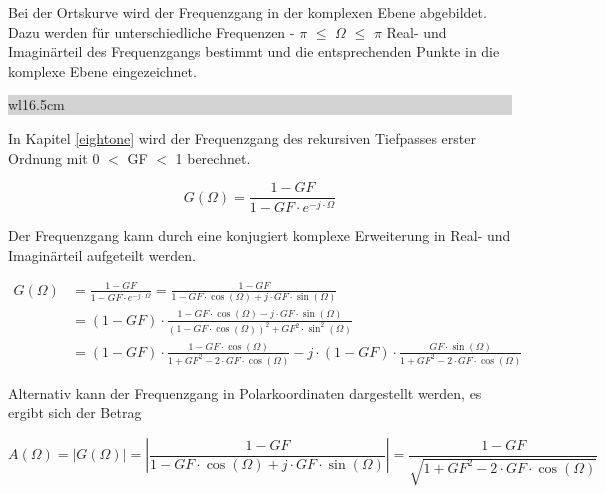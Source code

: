 \noindent Bei der Ortskurve wird der Frequenzgang in der komplexen Ebene abgebildet. Dazu werden f\"{u}r unterschiedliche Frequenzen - $\pi$ $\mathrm{\le}$ $\Omega$ $\mathrm{\le}$ $\pi$ Real- und Imagin\"{a}rteil des Frequenzgangs bestimmt und die entsprechenden Punkte in die komplexe Ebene eingezeichnet. \bigskip

\noindent
\colorbox{lightgray}{%
%
\renewcommand\arraystretch{0.6}%
\begin{tabular}{ wl{16.5cm} }
{\selectfont{Beispiel: Rekursives Tiefpass-Filter}}
\end{tabular}%
}\medskip

\noindent In Kapitel \ref{eightone} wird der Frequenzgang des rekursiven Tiefpasses erster Ordnung mit 0 $\mathrm{<}$ GF $\mathrm{<}$ 1 berechnet.

\begin{equation}\label{eq:eighttwentynine}
G\left(\Omega \right)=\frac{1-GF}{1-GF\cdot e^{-j\cdot \Omega } }
\end{equation}

\noindent Der Frequenzgang kann durch eine konjugiert komplexe Erweiterung in Real- und Imagin\"{a}rteil aufgeteilt werden.

\begin{equation}\label{eq:eightthirty}
\begin{split}
G\left(\Omega \right) & =\frac{1-GF}{1-GF\cdot e^{-j\cdot \Omega } } =\frac{1-GF}{1-GF\cdot \cos \left(\Omega \right)+j\cdot GF\cdot \sin \left(\Omega \right)} \\ 
& =\left(1-GF\right)\cdot \frac{1-GF\cdot \cos \left(\Omega \right)-j\cdot GF\cdot \sin \left(\Omega \right)}{\left(1-GF\cdot \cos \left(\Omega \right)\right)^{2} +GF^{2} \cdot \sin ^{2} \left(\Omega \right)} \\ 
& =\left(1-GF\right)\cdot \frac{1-GF\cdot \cos \left(\Omega \right)}{1+GF^{2} -2\cdot GF\cdot \cos \left(\Omega \right)} -j\cdot \left(1-GF\right)\cdot \frac{GF\cdot \sin \left(\Omega \right)}{1+GF^{2} -2\cdot GF\cdot \cos \left(\Omega \right)}
\end{split}
\end{equation}

\noindent Alternativ kann der Frequenzgang in Polarkoordinaten dargestellt werden, es ergibt sich der Betrag

\begin{equation}\label{eq:eightthirtyone}
A\left(\Omega \right)=\left|G\left(\Omega \right)\right|=\left|\frac{1-GF}{1-GF\cdot \cos \left(\Omega \right)+j\cdot GF\cdot \sin \left(\Omega \right)} \right|=\frac{1-GF}{\sqrt{1+GF^{2} -2\cdot GF\cdot \cos \left(\Omega \right)}}
\end{equation}

